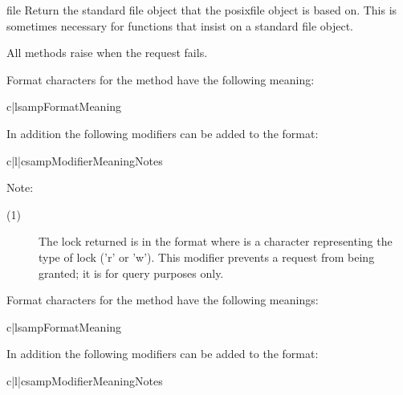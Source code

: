 \begin{methoddesc}[posixfile]{file}{}
 Return the standard file object that the posixfile object is based
 on.  This is sometimes necessary for functions that insist on a
 standard file object.
\end{methoddesc}

All methods raise  when the request fails.

Format characters for the  method have the following
meaning:

\begin{tableii}{c|l}{samp}{Format}{Meaning}
\end{tableii}

In addition the following modifiers can be added to the format:

\begin{tableiii}{c|l|c}{samp}{Modifier}{Meaning}{Notes}
\end{tableiii}

\noindent
Note:

\begin{description}
\item[(1)] The lock returned is in the format  where  is a character
representing the type of lock ('r' or 'w').  This modifier prevents a
request from being granted; it is for query purposes only.
\end{description}

Format characters for the  method have the following
meanings:

\begin{tableii}{c|l}{samp}{Format}{Meaning}
\end{tableii}

In addition the following modifiers can be added to the format:

\begin{tableiii}{c|l|c}{samp}{Modifier}{Meaning}{Notes}
\end{tableiii}

